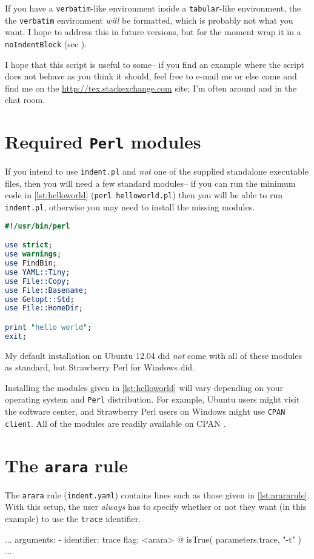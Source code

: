 If you have a \lstinline!verbatim!-like environment inside a \lstinline!tabular!-like
environment, the the \lstinline!verbatim! environment \emph{will} be formatted, which 
is probably not what you want. I hope to address this in future versions, but for the 
moment wrap it in a \lstinline!noIndentBlock! (see ).
      
I hope that this script is useful to some-- if you find an example where the 
script does not behave as you think it should, feel free to e-mail me or else
come and find me on the \url{http://tex.stackexchange.com} site; I'm often around 
and in the chat room.
      
\printbibliography[heading=bibintoc]

\appendix
\section{Required \lstinline!Perl! modules}\label{sec:requiredmodules}
If you intend to use \lstinline!indent.pl! and \emph{not} one of the supplied standalone executable files, then you will need a few standard modules-- if you can run the 
minimum code in \cref{lst:helloworld} (\lstinline!perl helloworld.pl!) then you will be able to run \lstinline!indent.pl!, otherwise you may 
need to install the missing modules.
 	 	 	 	 	
\begin{lstlisting}[language=Perl,caption={\lstinline!helloworld.pl!},label={lst:helloworld}]
#!/usr/bin/perl

use strict;
use warnings;           
use FindBin;            
use YAML::Tiny;         
use File::Copy;         
use File::Basename;     
use Getopt::Std;        
use File::HomeDir;      

print "hello world";
exit;
\end{lstlisting}
My default installation on Ubuntu 12.04 did \emph{not} come
with all of these modules as standard, but Strawberry Perl for Windows \cite{strawberryperl}
did.
	
Installing the modules given in \cref{lst:helloworld} will vary depending on your 
operating system and \lstinline!Perl! distribution. For example, Ubuntu users 
might visit the software center, and Strawberry Perl users on Windows might use 
\lstinline!CPAN client!. All of the modules are readily available on CPAN \cite{cpan}.

\section{The \lstinline!arara! rule}
The \lstinline!arara! rule (\lstinline!indent.yaml!) contains lines such as those
given in \cref{lst:arararule}. With this setup, the user \emph{always} has 
to specify whether or not they want (in this example) to use the \lstinline!trace!
identifier.
\begin{yaml}[caption={The \lstinline!arara! rule},label={lst:arararule},numbers=none]
...
arguments:
- identifier: trace
  flag: <arara> @{ isTrue( parameters.trace, "-t" ) }
...
\end{yaml}

